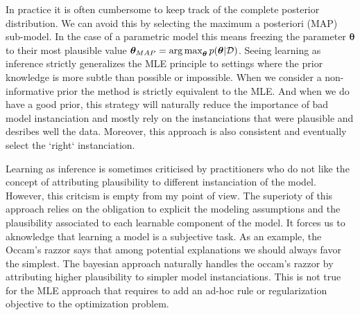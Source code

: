 In practice it is often cumbersome to keep track of the complete posterior distribution. We can avoid this by selecting the maximum a posteriori (MAP) sub-model. In the case of a parametric model this means freezing the parameter $\bm \theta$ to their most plausible value $\bm \theta_{MAP} = \operatorname*{arg\,max}_{\bm \theta} p(\bm \theta | \mathcal{D})$. Seeing learning as inference strictly generalizes the MLE principle to settings where the prior knowledge is more subtle than possible or impossible. When we consider a non-informative prior the method is strictly equivalent to the MLE. And when we do have a good prior, this strategy will naturally reduce the importance of bad model instanciation and mostly rely on the instanciations that were plausible and desribes well the data. Moreover, this approach is also consistent and eventually select the `right` instanciation.

Learning as inference is sometimes criticised by practitioners who do not like the concept of attributing plausibility to different instanciation of the model. However, this critcism is empty from my point of view. The superioty of this approach relies on the obligation to explicit the modeling assumptions and the plausibility associated to each learnable component of the model. It forces us to aknowledge that learning a model is a subjective task. As an example, the Occam's razzor says that among potential explanations we should always favor the simplest. The bayesian approach naturally handles the occam's razzor by attributing higher plausibility to simpler model instanciations. This is not true for the MLE approach that requires to add an ad-hoc rule or regularization objective to the optimization problem.

%
